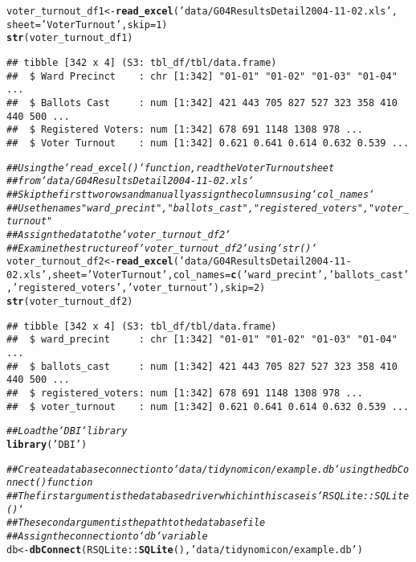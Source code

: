 \documentclass{article}\usepackage[]{graphicx}\usepackage[]{xcolor}
\makeatletter
\newcommand{\hlnum}[1]{\textcolor[rgb]{0.686,0.059,0.569}{#1}}%
\newcommand{\hlstr}[1]{\textcolor[rgb]{0.192,0.494,0.8}{#1}}%
\newcommand{\hlcom}[1]{\textcolor[rgb]{0.678,0.584,0.686}{\textit{#1}}}%
\newcommand{\hlopt}[1]{\textcolor[rgb]{0,0,0}{#1}}%
\newcommand{\hlstd}[1]{\textcolor[rgb]{0.345,0.345,0.345}{#1}}%
\newcommand{\hlkwb}[1]{\textcolor[rgb]{0.69,0.353,0.396}{#1}}%
\newcommand{\hlkwc}[1]{\textcolor[rgb]{0.333,0.667,0.333}{#1}}%
\newcommand{\hlkwd}[1]{\textcolor[rgb]{0.737,0.353,0.396}{\textbf{#1}}}%
\newenvironment{kframe}{%
 \def\at@end@of@kframe{}%
 \ifinner\ifhmode%
  \def\at@end@of@kframe{\end{minipage}}%
  \begin{minipage}{\columnwidth}%
 \fi\fi%
 \def\FrameCommand##1{\hskip\@totalleftmargin \hskip-\fboxsep
 \colorbox{shadecolor}{##1}\hskip-\fboxsep
     \hskip-\linewidth \hskip-\@totalleftmargin \hskip\columnwidth}%
 \MakeFramed {\advance\hsize-\width
   \@totalleftmargin\z@ \linewidth\hsize
   \@setminipage}}%
 {\par\unskip\endMakeFramed%
 \at@end@of@kframe}
\newenvironment{knitrout}{}{} %
\makeatother
\begin{document}
\begin{knitrout}
\begin{kframe}
\begin{alltt}
\hlstd{voter_turnout_df1} \hlkwb{<-} \hlkwd{read_excel}\hlstd{(}\hlstr{'data/G04ResultsDetail2004-11-02.xls'}\hlstd{,}
                                \hlkwc{sheet} \hlstd{=} \hlstr{'Voter Turnout'}\hlstd{,} \hlkwc{skip} \hlstd{=} \hlnum{1}\hlstd{)}
\hlkwd{str}\hlstd{(voter_turnout_df1)}
\end{alltt}
\begin{verbatim}
## tibble [342 x 4] (S3: tbl_df/tbl/data.frame)
##  $ Ward Precinct    : chr [1:342] "01-01" "01-02" "01-03" "01-04" ...
##  $ Ballots Cast     : num [1:342] 421 443 705 827 527 323 358 410 440 500 ...
##  $ Registered Voters: num [1:342] 678 691 1148 1308 978 ...
##  $ Voter Turnout    : num [1:342] 0.621 0.641 0.614 0.632 0.539 ...
\end{verbatim}
\begin{alltt}
\hlcom{## Using the `read_excel()` function, read the Voter Turnout sheet}
\hlcom{## from `data/G04ResultsDetail2004-11-02.xls`}
\hlcom{## Skip the first two rows and manually assign the columns using `col_names`}
\hlcom{## Use the names "ward_precint", "ballots_cast", "registered_voters", "voter_turnout"}
\hlcom{## Assign the data to the `voter_turnout_df2`}
\hlcom{## Examine the structure of `voter_turnout_df2` using `str()`}
\hlstd{voter_turnout_df2} \hlkwb{<-} \hlkwd{read_excel}\hlstd{(}\hlstr{'data/G04ResultsDetail2004-11-02.xls'}\hlstd{,} \hlkwc{sheet} \hlstd{=} \hlstr{'Voter Turnout'}\hlstd{,} \hlkwc{col_names} \hlstd{=} \hlkwd{c}\hlstd{(}\hlstr{'ward_precint'}\hlstd{,} \hlstr{'ballots_cast'}\hlstd{,} \hlstr{'registered_voters'}\hlstd{,} \hlstr{'voter_turnout'}\hlstd{),} \hlkwc{skip} \hlstd{=} \hlnum{2}\hlstd{)}
\hlkwd{str}\hlstd{(voter_turnout_df2)}
\end{alltt}
\begin{verbatim}
## tibble [342 x 4] (S3: tbl_df/tbl/data.frame)
##  $ ward_precint     : chr [1:342] "01-01" "01-02" "01-03" "01-04" ...
##  $ ballots_cast     : num [1:342] 421 443 705 827 527 323 358 410 440 500 ...
##  $ registered_voters: num [1:342] 678 691 1148 1308 978 ...
##  $ voter_turnout    : num [1:342] 0.621 0.641 0.614 0.632 0.539 ...
\end{verbatim}
\begin{alltt}
\hlcom{## Load the `DBI` library}
\hlkwd{library}\hlstd{(}\hlstr{'DBI'}\hlstd{)}

\hlcom{## Create a database connection to `data/tidynomicon/example.db` using the dbConnect() function}
\hlcom{## The first argument is the database driver which in this case is `RSQLite::SQLite()`}
\hlcom{## The second argument is the path to the database file}
\hlcom{## Assign the connection to `db` variable}
\hlstd{db} \hlkwb{<-} \hlkwd{dbConnect}\hlstd{(RSQLite}\hlopt{::}\hlkwd{SQLite}\hlstd{(),} \hlstr{'data/tidynomicon/example.db'}\hlstd{)}


\end{alltt}
\end{kframe}
\end{knitrout}
\end{document}
